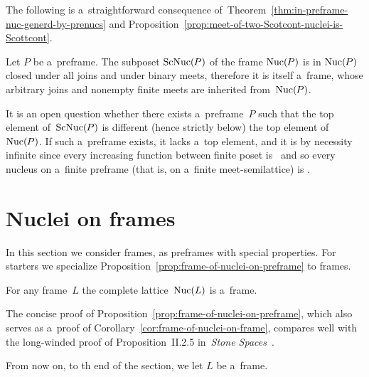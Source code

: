 \documentclass[11pt,letterpaper]{article}
\renewcommand{\thmskip}{\bigskip}
\begin{document}
The following is a~straightforward consequence
	of~Theorem~\ref{thm:in-preframe-nuc-generd-by-prenucs}
	and Proposition~\ref{prop:meet-of-two-Scotcont-nuclei-is-Scottcont}.

\thmskip

\begin{corollary}\label{cor:ScNuc(preframe)-is-frame}
Let\/ $P$ be a~preframe.
The subposet\/ $\mathop{\smash{\mathrm{ScNuc}}}\nolimits(\mspace{-1mu} P)$ of the frame\/ $\mathop{\smash{\mathrm{Nuc}}}\nolimits(\mspace{-1mu} P)$
	is in $\mathop{\smash{\mathrm{Nuc}}}\nolimits(\mspace{-1mu} P)$ closed under all joins and under binary meets,
therefore it is itself a~frame,
	whose arbitrary joins and nonempty finite meets are inherited from\/~$\mathop{\smash{\mathrm{Nuc}}}\nolimits(\mspace{-1mu} P)$.
\end{corollary}

\thmskip

It is an open question whether there exists a~preframe~$P$
such that the top element of~$\mathop{\smash{\mathrm{ScNuc}}}\nolimits(\mspace{-1mu} P)$
	is different (hence strictly below) the top element of~$\mathop{\smash{\mathrm{Nuc}}}\nolimits(\mspace{-1mu} P)$.
If such a~preframe exists, it lacks a~top element,
and it is by necessity infinite
	since every increasing function between finite poset is \Scottcont\
and so every nucleus on a~finite preframe (that is, on a~finite meet-semilattice) is \Scottcont.


\section{Nuclei on frames}
\label{sec:nucs-on-frames}

In this section we consider frames, as preframes with special properties.
For starters we specialize Proposition~\ref{prop:frame-of-nuclei-on-preframe} to frames.

\thmskip

\begin{corollary}\label{cor:frame-of-nuclei-on-frame}
For any frame\/~$L$ the complete lattice\/~$\mathop{\smash{\mathrm{Nuc}}}\nolimits(L)$ is a~frame.
\end{corollary}

\thmskip

The concise proof of Proposition~\ref{prop:frame-of-nuclei-on-preframe},
	which also serves as a~proof of Corollary~\ref{cor:frame-of-nuclei-on-frame},
compares well with the long-winded proof of
	Proposition~II.2.5 in~\textit{Stone Spaces\/}~\cite{johnstoneSS}.

\txtskip

From now on, to th end of the section, we let $L$ be a~frame.
\end{document}
